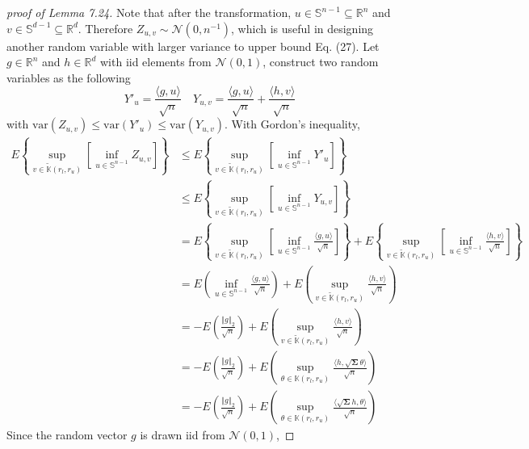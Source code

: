 \documentclass[a4paper, 11pt]{article}
\begin{document}
\begin{proof}[proof of Lemma 7.24]
Note that after the transformation, $u\in\mathbb{S}^{n-1}\subseteq\mathbb{R}^n$ and $v\in\mathbb{S}^{d-1}\subseteq\mathbb{R}^d$. Therefore $Z_{u, v}\sim\mathcal{N}(0, n^{-1})$, which is useful in designing another random variable with larger variance to upper bound Eq. (27). Let $g\in\mathbb{R}^n$ and $h\in\mathbb{R}^d$ with iid elements from $\mathcal{N}(0,1)$, construct two random variables as the following
\begin{equation}
Y'_{u} = \frac{\langle g,u \rangle}{\sqrt{n}} \quad Y_{u, v} = \frac{\langle g,u \rangle}{\sqrt{n}} + \frac{\langle h,v \rangle}{\sqrt{n}}
\end{equation}
with $\text{var}(Z_{u, v}) \leq \text{var}(Y'_{u}) \leq \text{var}(Y_{u, v})$. With Gordon's inequality, 
\begin{equation}
\begin{split}
E\left\{\sup_{v\in\tilde{\mathbb{K}}(r_l, r_u)}\left[\inf_{u\in\mathbb{S}^{n-1}}Z_{u,v}\right] \right\} & \leq E\left\{\sup_{v\in\tilde{\mathbb{K}}(r_l, r_u)}\left[\inf_{u\in\mathbb{S}^{n-1}}Y'_{u}\right] \right\}\\
 & \leq E\left\{\sup_{v\in\tilde{\mathbb{K}}(r_l, r_u)}\left[\inf_{u\in\mathbb{S}^{n-1}}Y_{u,v}\right] \right\}\\
 & = E\left\{\sup_{v\in\tilde{\mathbb{K}}(r_l, r_u)}\left[\inf_{u\in\mathbb{S}^{n-1}}\frac{\langle g,u \rangle}{\sqrt{n}}\right] \right\} + E\left\{\sup_{v\in\tilde{\mathbb{K}}(r_l, r_u)}\left[\inf_{u\in\mathbb{S}^{n-1}}\frac{\langle h,v \rangle}{\sqrt{n}}\right] \right\} \\
 & = E\left( \inf_{u\in\mathbb{S}^{n-1}}\frac{\langle g,u \rangle}{\sqrt{n}}\right) + E\left(\sup_{v\in\tilde{\mathbb{K}}(r_l, r_u)}\frac{\langle h,v \rangle}{\sqrt{n}}\right)\\
 & = -E\left(\frac{\left\Vert g \right\Vert_2}{\sqrt{n}} \right) + E\left(\sup_{v\in\tilde{\mathbb{K}}(r_l, r_u)}\frac{\langle h,v \rangle}{\sqrt{n}}\right) \\ 
 & = -E\left(\frac{\left\Vert g \right\Vert_2}{\sqrt{n}} \right) + E\left(\sup_{\theta\in{\mathbb{K}}(r_l, r_u)}\frac{\langle h, \sqrt{\mathbf{\Sigma}}\theta \rangle}{\sqrt{n}}\right)\\
 & = -E\left(\frac{\left\Vert g \right\Vert_2}{\sqrt{n}} \right) + E\left(\sup_{\theta\in{\mathbb{K}}(r_l, r_u)}\frac{\langle \sqrt{\mathbf{\Sigma}}h, \theta \rangle}{\sqrt{n}}\right)
\end{split}
\end{equation}
Since the random vector $g$ is drawn iid from $\mathcal{N}(0,1)$, 

\end{proof}
\end{document}
